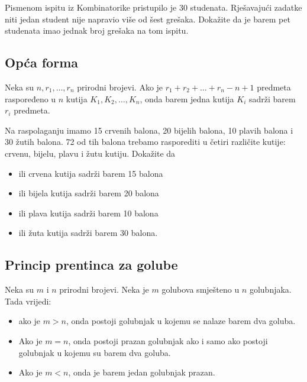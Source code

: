 \begin{example}
    Pismenom ispitu iz Kombinatorike pristupilo je 30 studenata. Rješavajući
    zadatke niti jedan student nije napravio više od šest grešaka. Dokažite da
    je barem pet studenata imao jednak broj grešaka na tom ispitu.
\end{example}

\subsection{Opća forma}

\begin{theorem}
    Neka su $n, r_1, \dots, r_n$ prirodni brojevi. Ako je
    $r_1+r_2+\dots+r_n-n+1$ predmeta raspoređeno u $n$ kutija $K_1, K_2, \dots,
    K_n$, onda barem jedna kutija $K_i$ sadrži barem $r_i$ predmeta.
\end{theorem}

\begin{example}
    Na raspolaganju imamo 15 crvenih balona, 20 bijelih balona, 10 plavih balona
    i 30 žutih balona. 72 od tih balona trebamo rasporediti u četiri različite
    kutije: crvenu, bijelu, plavu i žutu kutiju. Dokažite da
    \begin{itemize}
        \item ili crvena kutija sadrži barem 15 balona
        \item ili bijela kutija sadrži barem 20 balona
        \item ili plava kutija sadrži barem 10 balona
        \item ili žuta kutija sadrži barem 30 balona.
    \end{itemize}
\end{example}

\subsection{Princip prentinca za golube}

Neka su $m$ i $n$ prirodni brojevi. Neka je $m$ golubova smješteno u $n$
golubnjaka. Tada vrijedi:

\begin{itemize}
    \item ako je $m>n$, onda postoji golubnjak u kojemu se nalaze barem dva
    goluba.
    \item Ako je $m=n$, onda postoji prazan golubnjak ako i samo ako postoji
    golubnjak u kojemu su barem dva goluba.
    \item Ako je $m<n$, onda je barem jedan golubnjak prazan.
\end{itemize}


